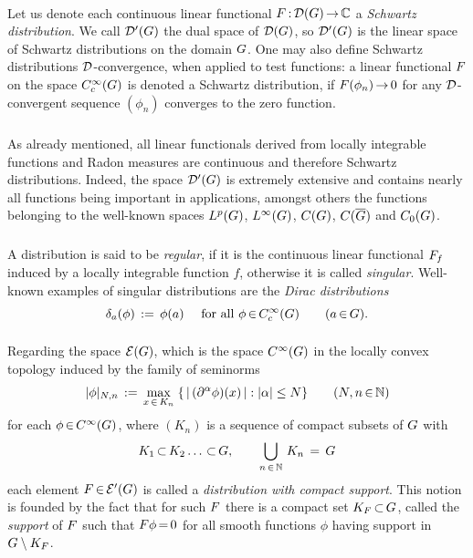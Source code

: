 \documentclass[11pt,twoside]{article}
\begin{document}
\paragraph{} %
Let us denote each continuous linear functional $F {\,:\,} {\mathcal{D}}(G) {\,\to\,} {\mathbb{C}}$ 
a \textit{Schwartz distribution}.
We call ${\mathcal{D}}'(G)$ the dual space of ${\mathcal{D}}(G)$,
so ${\mathcal{D}}'(G)$ is the linear space of Schwartz distributions on the domain $G$.
One may also define Schwartz distributions {\wrt} ${\mathcal{D}}$-convergence,
when applied to test functions:
a linear functional $F$ on the space $C_c^{\infty}(G)$
is denoted a Schwartz distribution,
if $F(\phi_n) {\,\to\,} 0$ for any ${\mathcal{D}}$-convergent sequence $(\phi_n)$
converges to the zero function.

\subparagraph{}
As already mentioned,
all linear functionals derived from locally integrable functions
and Radon measures are continuous and therefore Schwartz distributions.
Indeed,
the space ${\mathcal{D}}'(G)$ is extremely extensive
and contains nearly all functions being important in applications,
amongst others the functions
belonging to the well-known spaces $L^p(G)$, $L^{\infty}(G)$, $C(G)$,
$C(\overline{G})$ and $C_0(G)$.

\subparagraph{}
A distribution is said to be \textit{regular},
if it is the continuous linear functional $F_f$
induced by a locally integrable function $f$,
otherwise it is called \textit{singular}.
Well-known examples of singular distributions are
the \textit{Dirac distributions}
\[
\delta_a(\phi) \,:=\, \phi(a)
\quad \mbox{ for all } \phi {\,\in\,} C_c^{\infty}(G)
\quad \quad  (a {\,\in\,} G).
\]

\paragraph{} %
Regarding the space ${\mathcal{E}}(G)$,
which is the space $C^{\infty}(G)$ in the locally convex topology
induced by the family of seminorms
\[
\abs{\phi} _{N,n}
\eqdef
\max_{x \xeof K_n} \;
\{ \, \abs{\, (\PA \phi)(x) \,} : \abs{\alpha} \leq N \}
\quad \quad (N,n \xeof \N)
\]
for each $\phi {\,\in\,} C^{\infty}(G)$,
where $(K_n)$ is a sequence of compact subsets of $G$ with
\[
K_1 {\,\subset\,} K_2 \ldots {\,\subset\,} G,
\quad \quad
\bigcup_{n {\,\in\,} {\mathbb{N}}} \, K_n \,=\, G
\]
each element $F {\,\in\,} {\mathcal{E}}'(G)$ is called
a \textit{distribution with compact support}.
This notion is founded by the fact
that for such $F$ there is a compact set $K_F {\,\subset\,} G$,
called the \textit{support} of $F$
such that
$F \phi {\,=\,} 0$ for all smooth functions $\phi$
having support in $G \setminus K_F$.
\end{document}
